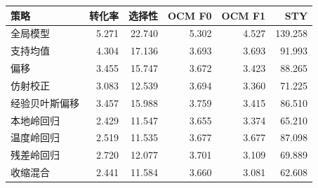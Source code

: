 \begin{tabular}{lrrrrr}
\toprule
策略 & 转化率 & 选择性 & OCM F0 & OCM F1 & STY \\
\midrule
全局模型 & 5.271 & 22.740 & 5.302 & 4.527 & 139.258 \\
支持均值 & 4.304 & 17.136 & 3.693 & 3.693 & 91.993 \\
偏移 & 3.455 & 15.747 & 3.672 & 3.423 & 88.265 \\
仿射校正 & 3.083 & 12.539 & 3.694 & 3.360 & 71.225 \\
经验贝叶斯偏移 & 3.457 & 15.988 & 3.759 & 3.415 & 86.510 \\
本地岭回归 & 2.429 & 11.547 & 3.655 & 3.374 & 65.210 \\
温度岭回归 & 2.519 & 11.535 & 3.677 & 3.677 & 87.098 \\
残差岭回归 & 2.720 & 12.077 & 3.701 & 3.109 & 69.889 \\
收缩混合 & 2.441 & 11.584 & 3.660 & 3.081 & 62.608 \\
\bottomrule
\end{tabular}
